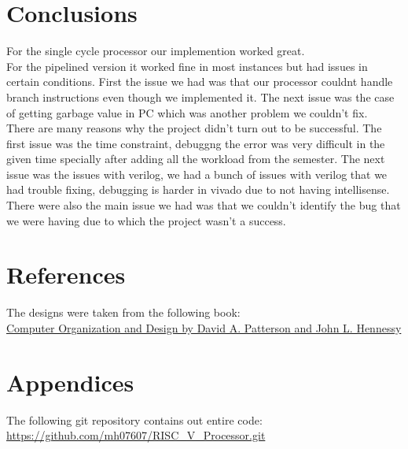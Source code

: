 \documentclass[a4paper, 12pt]{report}
\begin{document}
\section*{Conclusions}
For the single cycle processor our implemention worked great.
\\For the pipelined version it worked fine in most instances but had issues in certain conditions.
First the issue we had was that our processor couldnt handle branch instructions even though we implemented it. The next issue was the case of getting garbage value in PC which was another problem we couldn't fix.
\\There are many reasons why the project didn't turn out to be successful. The first issue was the time constraint, debuggng the error was very difficult in the given time specially after adding all the workload from the semester.
The next issue was the issues with verilog, we had a bunch of issues with verilog that we had trouble fixing, debugging is harder in vivado due to not having intellisense.
\\There were also the main issue we had was that we couldn't identify the bug that we were having due to which the project wasn't a success.
\section*{References}
The designs were taken from the following book:
\\\href{http://home.ustc.edu.cn/~louwenqi/reference_books_tools/Computer%20Organization%20and%20Design%20RISC-V%20edition.pdf}{Computer Organization and Design by David A. Patterson and John L. Hennessy}
\section*{Appendices}
The following git repository contains out entire code:
\\\href{https://github.com/mh07607/RISC_V_Processor.git}{\url{https://github.com/mh07607/RISC_V_Processor.git}}
\end{document}
